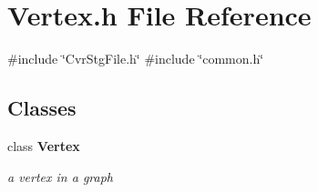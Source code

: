 \section{Vertex.\+h File Reference}
\label{Vertex_8h}
{\ttfamily \#include \char`\"{}Cvr\+Stg\+File.\+h\char`\"{}}\newline
{\ttfamily \#include \char`\"{}common.\+h\char`\"{}}\newline
\subsection*{Classes}
\begin{DoxyCompactItemize}
\item 
class \textbf{ Vertex}
\begin{DoxyCompactList}\small\item\em a vertex in a graph \end{DoxyCompactList}\end{DoxyCompactItemize}
